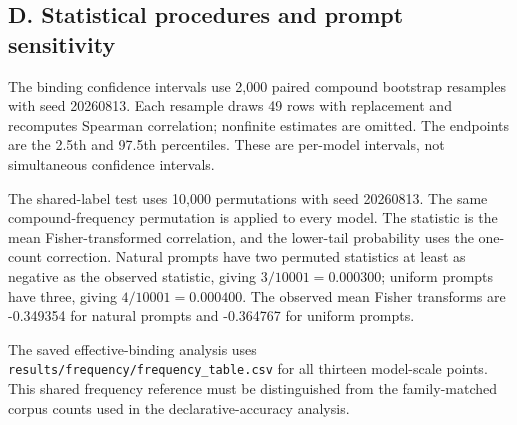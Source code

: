 \documentclass[
  english,
]{article}
\begin{document}
\subsection{D. Statistical procedures and prompt sensitivity}\label{d.-statistical-procedures-and-prompt-sensitivity}

The binding confidence intervals use 2,000 paired compound bootstrap resamples with seed 20260813. Each resample draws 49 rows with replacement and recomputes Spearman correlation; nonfinite estimates are omitted. The endpoints are the 2.5th and 97.5th percentiles. These are per-model intervals, not simultaneous confidence intervals.

The shared-label test uses 10,000 permutations with seed 20260813. The same compound-frequency permutation is applied to every model. The statistic is the mean Fisher-transformed correlation, and the lower-tail probability uses the one-count correction. Natural prompts have two permuted statistics at least as negative as the observed statistic, giving \(3/10001 = 0.000300\); uniform prompts have three, giving \(4/10001 = 0.000400\). The observed mean Fisher transforms are -0.349354 for natural prompts and -0.364767 for uniform prompts.

The saved effective-binding analysis uses \texttt{results/frequency/frequency\_table.csv} for all thirteen model-scale points. This shared frequency reference must be distinguished from the family-matched corpus counts used in the declarative-accuracy analysis.
\end{document}

